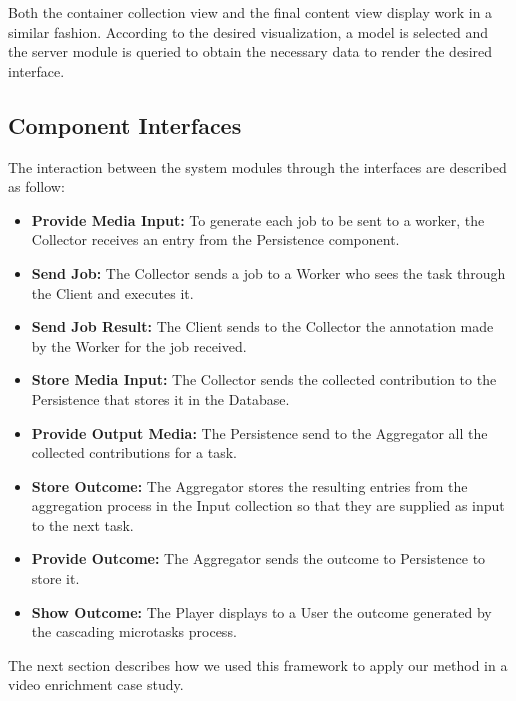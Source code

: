 Both the container collection view and the final content view display work in a similar fashion. According to the desired visualization, a model is selected and the server module is queried to obtain the necessary data to render the desired interface. 





\subsection{Component Interfaces}

The interaction between the system modules through the interfaces are described as follow:
\begin{itemize}
\item \textbf{Provide Media Input:} To generate each job to be sent to a worker, the Collector receives an entry from the Persistence component.

\item \textbf{Send Job:} The Collector sends a job to a Worker who sees the task through the Client and executes it.

\item \textbf{Send Job Result:} The Client sends to the Collector the annotation made by the Worker for the job received.

\item \textbf{Store Media Input:} The Collector sends the collected contribution to the Persistence that stores it in the Database.

\item \textbf{Provide Output Media:} The Persistence send to the Aggregator all the collected contributions for a task.

\item \textbf{Store Outcome:} The Aggregator stores the resulting entries from the aggregation process in the Input collection so that they are supplied as input to the next task.

\item \textbf{Provide Outcome:} The Aggregator sends the outcome to Persistence to store it.

\item \textbf{Show Outcome:} The Player displays to a User the outcome generated by the cascading microtasks process.

\end{itemize}

The next section describes how we used this framework to apply our method in a video enrichment case study.















